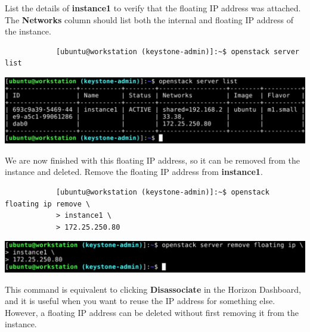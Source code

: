 \documentclass[letterpaper, 12pt]{article}
\begin{document}
\begin{enumerate}
    \begin{labstep}
        List the details of \textbf{instance1} to verify that the floating IP address was attached.
        The \textbf{Networks} column should list both the internal and floating IP address of the instance.
        \begin{lstlisting}
            [ubuntu@workstation (keystone-admin)]:~$ openstack server list
        \end{lstlisting}

        \begin{center}
            \includegraphics[width=\linewidth]{images/part3/step19.png}
        \end{center}
    \end{labstep}

    \begin{labstep}
        We are now finished with this floating IP address, so it can be removed from the instance and deleted.
        Remove the floating IP address from \textbf{instance1}.
        \begin{lstlisting}
            [ubuntu@workstation (keystone-admin)]:~$ openstack floating ip remove \
            > instance1 \
            > 172.25.250.80
        \end{lstlisting}

        \begin{center}
            \includegraphics[width=\linewidth]{images/part3/step20.png}
        \end{center}
    \end{labstep}

    \begin{tipbox}
        This command is equivalent to clicking \textbf{Disassociate} in the Horizon Dashboard, and it is useful when you want to reuse the IP address for something else.
        However, a floating IP address can be deleted without first removing it from the instance.
    \end{tipbox}


\end{enumerate}
\end{document}
